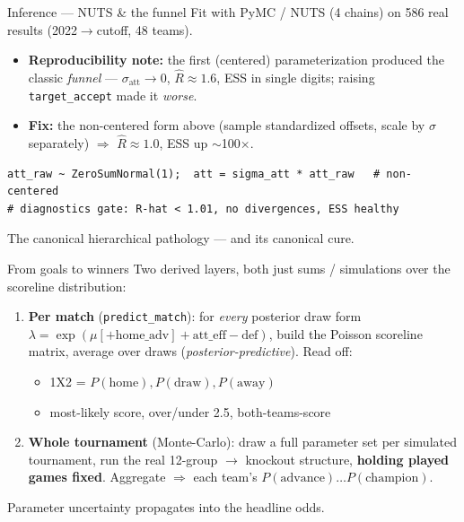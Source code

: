 \documentclass[aspectratio=169]{beamer}
\begin{document}
\begin{frame}[fragile]{Inference --- NUTS \& the funnel}
Fit with PyMC / NUTS (4 chains) on 586 real results (2022$\to$cutoff, 48 teams).
\begin{itemize}\footnotesize
  \item \textbf{Reproducibility note:} the first (centered) parameterization
        produced the classic \emph{funnel} --- $\sigma_{\text{att}}\!\to\!0$,
        $\hat R\approx 1.6$, ESS in single digits; raising \texttt{target\_accept}
        made it \emph{worse}.
  \item \textbf{Fix:} the non-centered form above (sample standardized offsets,
        scale by $\sigma$ separately) $\Rightarrow$ $\hat R\approx 1.0$, ESS up
        $\sim$100$\times$.
\end{itemize}
\begin{lstlisting}
att_raw ~ ZeroSumNormal(1);  att = sigma_att * att_raw   # non-centered
# diagnostics gate: R-hat < 1.01, no divergences, ESS healthy
\end{lstlisting}
\centering\scriptsize The canonical hierarchical pathology --- and its canonical cure.
\end{frame}

\begin{frame}{From goals to winners}
Two derived layers, both just sums / simulations over the scoreline distribution:
\begin{enumerate}\footnotesize
  \item \textbf{Per match} (\texttt{predict\_match}): for \emph{every} posterior
        draw form $\lambda=\exp(\mu[+\text{home\_adv}]+\text{att\_eff}-\text{def})$,
        build the Poisson scoreline matrix, average over draws
        (\emph{posterior-predictive}). Read off:
        \begin{itemize}\scriptsize
          \item 1X2 = $P(\text{home}), P(\text{draw}), P(\text{away})$
          \item most-likely score, over/under 2.5, both-teams-score
        \end{itemize}
  \item \textbf{Whole tournament} (Monte-Carlo): draw a full parameter set per
        simulated tournament, run the real 12-group $\to$ knockout structure,
        \textbf{holding played games fixed}. Aggregate $\Rightarrow$ each team's
        $P(\text{advance})\ldots P(\text{champion})$.
\end{enumerate}
\centering\scriptsize Parameter uncertainty propagates into the headline odds.
\end{frame}
\end{document}
